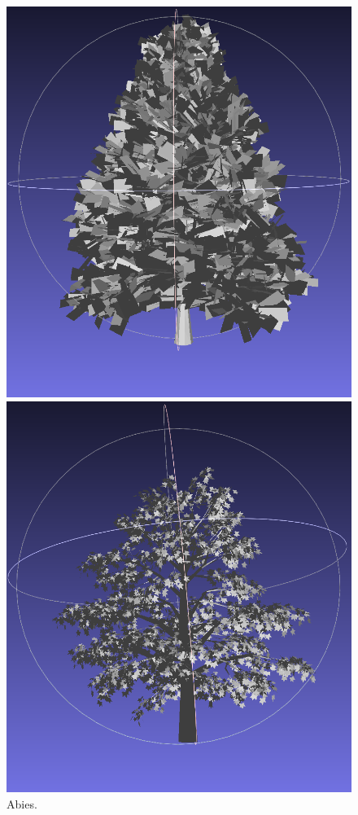 \documentclass[12pt]{article}
\begin{document}
\begin{figure}[H]
    \centering
    \begin{minipage}{0.24\textwidth}
        \centering
        \includegraphics[width=\textwidth]{images/abies.png}
        \caption{Abies.}
    \end{minipage}\hfill
    \begin{minipage}{0.24\textwidth}
        \centering
        \includegraphics[width=\textwidth]{images/acer.png}

\end{minipage}
\end{figure}
\end{document}
